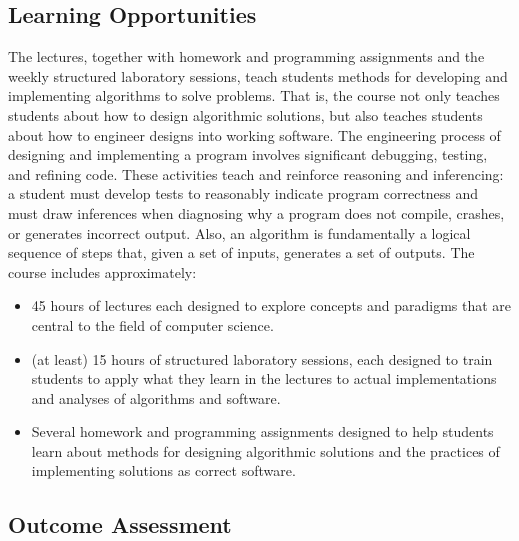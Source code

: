 \documentclass[12pt]{scrartcl}
\begin{document}
\subsection*{Learning Opportunities}
  
The lectures, together with homework and programming assignments and the weekly structured laboratory sessions, teach students methods for developing and implementing algorithms to solve problems.  That is, the course not only teaches students about how to design algorithmic solutions, but also teaches students about how to engineer designs into working software.  The engineering process of designing and implementing a program involves significant debugging, testing, and refining code.  These activities teach and reinforce reasoning and inferencing: a student must develop tests to reasonably indicate program correctness and must draw inferences when diagnosing why a program does not compile, crashes, or generates incorrect output.  Also, an algorithm is fundamentally a logical sequence of steps that, given a set of inputs, generates a set of outputs.
The course includes approximately:
  
\begin{itemize}
  \item 45 hours of lectures each designed to explore concepts and paradigms that are central to the field of computer science.
  \item (at least) 15 hours of structured laboratory sessions, each designed to train students to apply what they learn in the lectures to actual implementations and analyses of algorithms and software.
  \item Several homework and programming assignments designed to help students learn about methods for designing algorithmic solutions and the practices of implementing solutions as correct software.
\end{itemize}
  
\subsection*{Outcome Assessment}
  
\end{document}
